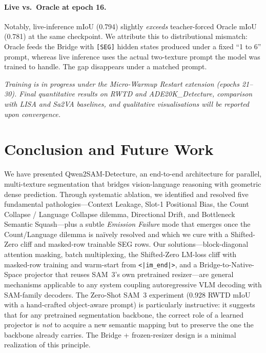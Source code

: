 \documentclass{article}
\begin{document}
\paragraph{Live vs.\ Oracle at epoch 16.}
Notably, live-inference mIoU (0.794) slightly \emph{exceeds} teacher-forced Oracle mIoU (0.781) at the same checkpoint. We attribute this to distributional mismatch: Oracle feeds the Bridge with \texttt{[SEG]} hidden states produced under a fixed ``1 to 6'' prompt, whereas live inference uses the actual two-texture prompt the model was trained to handle. The gap disappears under a matched prompt.

\emph{Training is in progress under the Micro-Warmup Restart extension (epochs 21--30). Final quantitative results on RWTD and ADE20K\_Detecture, comparison with LISA and Sa2VA baselines, and qualitative visualisations will be reported upon convergence.}

\section{Conclusion and Future Work}

We have presented Qwen2SAM-Detecture, an end-to-end architecture for parallel, multi-texture segmentation that bridges vision-language reasoning with geometric dense prediction. Through systematic ablation, we identified and resolved five fundamental pathologies---Context Leakage, Slot-1 Positional Bias, the Count Collapse / Language Collapse dilemma, Directional Drift, and Bottleneck Semantic Squash---plus a subtle \emph{Emission Failure} mode that emerges once the Count/Language dilemma is na\"ively resolved and which we cure with a Shifted-Zero cliff and masked-row trainable SEG rows. Our solutions---block-diagonal attention masking, batch multiplexing, the Shifted-Zero LM-loss cliff with masked-row training and warm-start from \texttt{<|im\_end|>}, and a Bridge-to-Native-Space projector that reuses SAM~3's own pretrained resizer---are general mechanisms applicable to any system coupling autoregressive VLM decoding with SAM-family decoders. The Zero-Shot SAM~3 experiment (0.928 RWTD mIoU with a hand-crafted object-aware prompt) is particularly instructive: it suggests that for any pretrained segmentation backbone, the correct role of a learned projector is \emph{not} to acquire a new semantic mapping but to preserve the one the backbone already carries. The Bridge + frozen-resizer design is a minimal realization of this principle.
\end{document}
